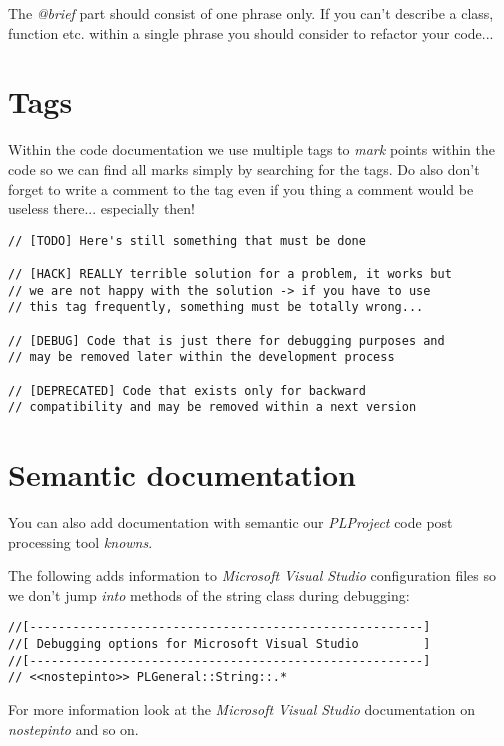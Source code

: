 The \emph{@brief} part should consist of one phrase only. If you can't describe a class, function etc. within a single phrase you should consider to refactor your code...




\section{Tags}
Within the code documentation we use multiple tags to \emph{mark} points within the code so we can find all marks simply by searching for the tags. Do also don't forget to write a comment to the tag even if you thing a comment would be useless there... especially then!

\begin{lstlisting}[caption=Comment tags]
// [TODO] Here's still something that must be done

// [HACK] REALLY terrible solution for a problem, it works but
// we are not happy with the solution -> if you have to use
// this tag frequently, something must be totally wrong...

// [DEBUG] Code that is just there for debugging purposes and
// may be removed later within the development process

// [DEPRECATED] Code that exists only for backward
// compatibility and may be removed within a next version
\end{lstlisting}




\section{Semantic documentation}
You can also add documentation with semantic our \emph{PLProject} code post processing tool \emph{knowns}.

The following adds information to \emph{Microsoft Visual Studio} configuration files so we don't jump \emph{into} methods of the string class during debugging:

\begin{lstlisting}[caption=Semantic documentation]
//[-------------------------------------------------------]
//[ Debugging options for Microsoft Visual Studio         ]
//[-------------------------------------------------------]
// <<nostepinto>> PLGeneral::String::.*
\end{lstlisting}

For more information look at the \emph{Microsoft Visual Studio} documentation on \emph{nostepinto} and so on.
